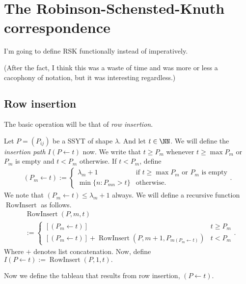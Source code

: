 \documentclass{article}
\DeclareMathOperator{\RowInsert}{RowInsert}
\begin{document}
\section{The Robinson-Schensted-Knuth correspondence}

I'm going to define RSK functionally instead of imperatively. 

(After the fact, I think this was a waste of time and was more or less a cacophony of notation, but it was interesting regardless.)

\subsection{Row insertion}


The basic operation will be that of \textit{row insertion}.

\begin{definition}
    Let $P = (P_{ij})$ be a SSYT of shape $\lambda$. And let $t \in \NN$. We will define the \textit{insertion path} $I(P\leftarrow t)$ now.
    We write that $t \geq P_m$ whenever $t \geq \max P_m$ or $P_m$ is empty and $t < P_m$ otherwise. 
    If $t < P_m$, define
    \begin{align*}
        (P_m \leftarrow t) := \begin{cases}
            \lambda_m + 1 & \text{if $t \geq \max P_m$ or $P_m$ is empty} \\
            \min\{n:P_{mn} > t\} & \text{otherwise}.
        \end{cases}.
    \end{align*}
    We note that $(P_m \leftarrow t) \leq \lambda_m + 1$ always.
    We will define a recursive function $\RowInsert$ as follows.
    \begin{align*}
        &\RowInsert(P,m,t) \\
        &:= \begin{cases}
            [(P_m \leftarrow t)] & t \geq P_m \\
            [(P_m \leftarrow t)] + \RowInsert(P, m+1, P_{m(P_m \leftarrow t)}) & t < P_m
        \end{cases}.
    \end{align*}
    Where $+$ denotes list concatenation.
    Now, define $I(P\leftarrow t) := \RowInsert(P,1,t).$
\end{definition}

Now we define the tableau that results from row insertion, $(P \leftarrow t)$.
\end{document}

